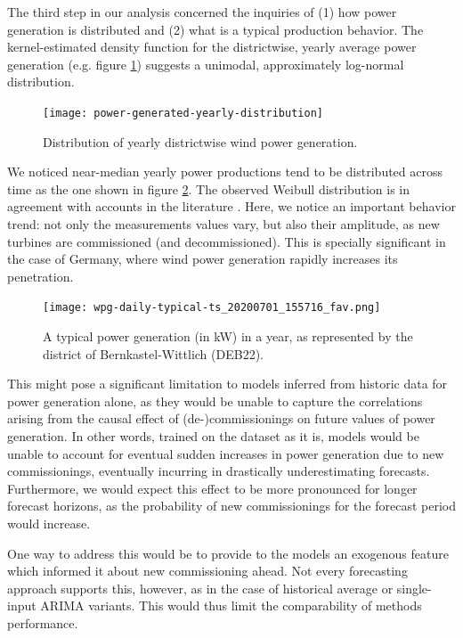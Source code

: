 The third step in our analysis concerned the inquiries of (1) how power generation is distributed and (2) what is a typical production behavior.
The kernel-estimated density function for the districtwise, yearly average power generation (e.g. figure \ref{fig:yearly_power_generation}) suggests a unimodal, approximately log-normal distribution.

\begin{figure}[H]%
	\centering
    \caption{Distribution of yearly districtwise wind power generation.}
    \texttt{[image: power-generated-yearly-distribution]}
	\label{fig:yearly_power_generation}
\end{figure}

We noticed near-median yearly power productions tend to be distributed across time as the one shown in figure \ref{fig:deb22_production_2015}.
The observed Weibull distribution is in agreement with accounts in the literature \cite{blaabjerg2017electronics, engeland2017variability, he2014short-term}.
Here, we notice an important behavior trend: not only the measurements values vary, but also their amplitude, as new turbines are commissioned (and decommissioned).
This is specially significant in the case of Germany, where wind power generation rapidly increases its penetration.

\begin{figure}[H]%
	\centering
    \caption{A typical power generation (in kW) in a year, as represented by the district of Bernkastel-Wittlich (DEB22).}
    \texttt{[image: wpg-daily-typical-ts\_20200701\_155716\_fav.png]}
	\label{fig:deb22_production_2015}
\end{figure}

This might pose a significant limitation to models inferred from historic data for power generation alone, as they would be unable to capture the correlations arising from the causal effect of (de-)commissionings on future values of power generation.
In other words, trained on the dataset as it is, models would be unable to account for eventual sudden increases in power generation due to new commissionings, eventually incurring in drastically underestimating forecasts.
Furthermore, we would expect this effect to be more pronounced for longer forecast horizons, as the probability of new commissionings for the forecast period would increase.

One way to address this would be to provide to the models an exogenous feature which informed it about new commissioning ahead.
Not every forecasting approach supports this, however, as in the case of historical average or single-input ARIMA variants.
This would thus limit the comparability of methods performance.

